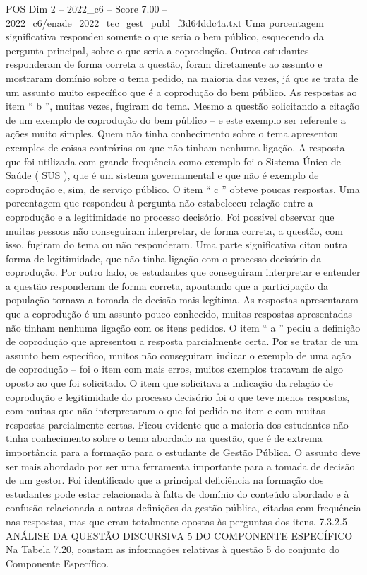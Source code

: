 \begin{textsample}{POS Dim 2 – 2022\_c6 – Score 7.00 – 2022\_c6/enade\_2022\_tec\_gest\_publ\_f3d64ddc4a.txt}
Uma porcentagem significativa respondeu somente o que seria o bem público, esquecendo da pergunta principal, sobre o que seria a coprodução.
Outros estudantes responderam de forma correta a questão, foram diretamente ao assunto e mostraram domínio sobre o tema pedido, na maioria das vezes, já que se trata de um assunto muito específico que é a coprodução do bem público.
As respostas ao item “ b ”, muitas vezes, fugiram do tema.
Mesmo a questão solicitando a citação de um exemplo de coprodução do bem público – e este exemplo ser referente a ações muito simples.
Quem não tinha conhecimento sobre o tema apresentou exemplos de coisas contrárias ou que não tinham nenhuma ligação.
A resposta que foi utilizada com grande frequência como exemplo foi o Sistema Único de Saúde ( SUS ), que é um sistema governamental e que não é exemplo de coprodução e, sim, de serviço público.
O item “ c ” obteve poucas respostas.
Uma porcentagem que respondeu à pergunta não estabeleceu relação entre a coprodução e a legitimidade no processo decisório.
Foi possível observar que muitas pessoas não conseguiram interpretar, de forma correta, a questão, com isso, fugiram do tema ou não responderam.
Uma parte significativa citou outra forma de legitimidade, que não tinha ligação com o processo decisório da coprodução.
Por outro lado, os estudantes que conseguiram interpretar e entender a questão responderam de forma correta, apontando que a participação da população tornava a tomada de decisão mais legítima.
As respostas apresentaram que a coprodução é um assunto pouco conhecido, muitas respostas apresentadas não tinham nenhuma ligação com os itens pedidos.
O item “ a ” pediu a definição de coprodução que apresentou a resposta parcialmente certa.
Por se tratar de um assunto bem específico, muitos não conseguiram indicar o exemplo de uma ação de coprodução – foi o item com mais erros, muitos exemplos tratavam de algo oposto ao que foi solicitado.
O item que solicitava a indicação da relação de coprodução e legitimidade do processo decisório foi o que teve menos respostas, com muitas que não interpretaram o que foi pedido no item e com muitas respostas parcialmente certas.
Ficou evidente que a maioria dos estudantes não tinha conhecimento sobre o tema abordado na questão, que é de extrema importância para a formação para o estudante de Gestão Pública.
O assunto deve ser mais abordado por ser uma ferramenta importante para a tomada de decisão de um gestor.
Foi identificado que a principal deficiência na formação dos estudantes pode estar relacionada à falta de domínio do conteúdo abordado e à confusão relacionada a outras definições da gestão pública, citadas com frequência nas respostas, mas que eram totalmente opostas às perguntas dos itens. 7.3.2.5 ANÁLISE DA QUESTÃO DISCURSIVA 5 DO COMPONENTE ESPECÍFICO Na Tabela 7.20, constam as informações relativas à questão 5 do conjunto do Componente Específico.

\end{textsample}
